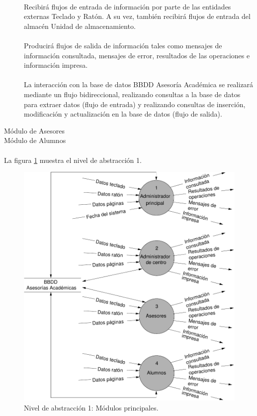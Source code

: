 \begin{description}
   \paragraph{}Recibirá flujos de entrada de información por parte de las
   entidades externas Teclado y Ratón. A su vez, también recibirá flujos de
   entrada del almacén Unidad de almacenamiento.

   \paragraph{}Producirá flujos de salida de información tales como mensajes de
   información consultada, mensajes de error, resultados de las operaciones e
   información impresa.

   \paragraph{}La interacción con la base de datos BBDD Asesoría Académica se
   realizará mediante un flujo bidireccional, realizando consultas a la base de
   datos para extraer datos (flujo de entrada) y realizando consultas de
   inserción, modificación y actualización en la base de datos (flujo de
   salida).

   \item[Módulo de Asesores]
   \item[Módulo de Alumnos]
  \end{description}

  \paragraph{}La figura \ref{diagramaNivel1} muestra el nivel de abstracción 1.

        \begin{figure}[!ht]
            \begin{center}
            \includegraphics[]{08.Analisis_Funcional/8.2.DFDs/Niveles/Diagramas/nivel1.pdf}
            \caption{Nivel de abstracción 1: Módulos principales.}
            \label{diagramaNivel1}
            \end{center}
         \end{figure}